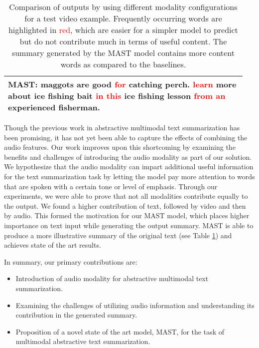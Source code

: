 \documentclass[11pt,a4paper]{article}
\newcommand\Tstrut{\rule{0pt}{2.6ex}}         \newcommand\Bstrut{\rule[-0.9ex]{0pt}{0pt}}
\begin{document}
\begin{table}
\begin{tabular}{|p{0.95\linewidth}|}
        \hline
        \Tstrut
        \textbf{MAST:} maggots are good \textcolor{red}{for} catching perch. \textcolor{red}{learn} more about ice fishing bait \textcolor{red}{in} \textcolor{red}{this} ice fishing lesson \textcolor{red}{from} \textcolor{red}{an} experienced fisherman.\Bstrut\\
        \hline
    \end{tabular}
    \caption{Comparison of outputs by using different modality configurations for a test video example. Frequently occurring words are highlighted in \textcolor{red}{red}, which are easier for a simpler model to predict but do not contribute much in terms of useful content. The summary generated by the MAST model contains more content words as compared to the baselines.}
    \label{tab:contents}
    \vspace{-3.5mm}
\end{table}

Though the previous work in abstractive multimodal text summarization has been promising, it has not yet been able to capture the effects of combining the audio features. Our work improves upon this shortcoming by examining the benefits and challenges of introducing the audio modality as part of our solution. We hypothesize that the audio modality can impart additional useful information for the text summarization task by letting the model pay more attention to words that are spoken with a certain tone or level of emphasis. Through our experiments, we were able to prove that not all modalities contribute equally to the output. We found a higher contribution of text, followed by video and then by audio. This formed the motivation for our MAST model, which places higher importance on text input while generating the output summary. MAST is able to produce a more illustrative summary of the original text (see Table \ref{tab:contents}) and achieves state of the art results.

In summary, our primary contributions are:
\vspace{-2.5mm}
\begin{itemize}
    \setlength\itemsep{0.05pt}
    \item Introduction of audio modality for abstractive multimodal text summarization.
    \item Examining the challenges of utilizing audio information and understanding its contribution in the generated summary.
    \item Proposition of a novel state of the art model, MAST, for the task of multimodal abstractive text summarization.
\end{itemize}
\end{document}
